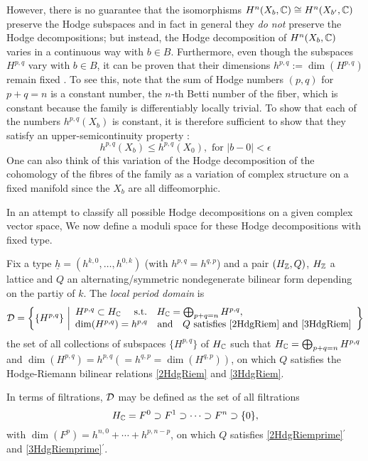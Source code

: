 \documentclass[../main.tex]{subfiles}
\begin{document}
However, there is no guarantee that the isomorphisms $H^n(X_b,\mathbb{C}) \cong H^n(X_{b'},\mathbb{C})$ preserve the Hodge subspaces and in fact in general they \emph{do not} preserve the Hodge decompositions; but instead, the Hodge decomposition of $H^n(X_b,\mathbb{C})$ varies in a continuous way with $b \in B$.
Furthermore, even though the subspaces $H^{p,q}$ vary with $b \in B$, it can be proven that their dimensions $h^{p,q} := \dim(H^{p,q})$ remain fixed \cite[Ch. 9]{Voi07}.
To see this, note that the sum of Hodge numbers $(p,q)$ for $p + q = n$ is a constant number, the $n$-th Betti number of the fiber, which is constant because the family is differentiably locally trivial. To show that each of the numbers $h^{p,q}(X_b)$ is constant, it is therefore sufficient to show that they satisfy an upper-semicontinuity property \cite[Cor. 9.19]{Voi07} :
\[
h^{p,q}(X_b) \leq h^{p,q}(X_0), \text{ for } |b - 0| < \epsilon 
\]
One can also think of this variation of the Hodge decomposition of the cohomology of the fibres of the family as a variation of complex structure on a fixed manifold since the $X_b$ are all diffeomorphic.


In an attempt to classify all possible Hodge decompositions on a given complex vector space, We now define a moduli space for these Hodge decompositions with fixed type.

\begin{defn} \label{Ddefn} Fix a type $\underline{h} = (h^{k,0}, \dots , h^{0,k})$ (with $h^{p,q}=h^{q,p}$) and a pair $(H_{\mathbb{Z}}, Q)$, $H_{\mathbb{Z}}$ a lattice and $Q$ an alternating/symmetric nondegenerate bilinear form depending on the partiy of $k$. 
The \emph{local period domain} is 
 \begin{align*}
 \mathcal{D} =  \left\{ \{H^{p,q}\}  \ \middle\vert \begin{array}{l}
    H^{p,q} \subset H_{\mathbb{C}} \quad \text{ s.t.} \quad H_{\mathbb{C}} = \bigoplus_{p+q=n} H^{p,q},  \\
    \dim (H^{p,q}) = h^{p,q} \quad \textrm{and} \quad Q \text{ satisfies } \eqref{2HdgRiem} \text{ and } \eqref{3HdgRiem}
  \end{array}\right\}
  \end{align*}
the set of all collections of subspaces $\{H^{p,q}\}$ of $H_{\mathbb{C}}$ such that $H_{\mathbb{C}} = \bigoplus_{p+q=n} H^{p,q}$ and $\dim (H^{p,q}) = h^{p,q} \left( =h^{q,p}= \dim (H^{q,p}) \right)$, on which $Q$ satisfies the Hodge-Riemann bilinear relations \eqref{2HdgRiem} and \eqref{3HdgRiem}.
\end{defn}


\begin{rem} In terms of filtrations, $\mathcal{D}$ may be defined as the set of all filtrations 
\[ H_{\mathbb{C}} =F^0 \supset F^1 \supset \cdots \supset F^n \supset \{0\},\]
with $\dim(F^p) = h^{n,0} + \cdots + h^{p,n-p}$, on which $Q$ satisfies \eqref{2HdgRiemprime}$^\prime$ and \eqref{3HdgRiemprime}$^\prime$.
\end{rem}
\end{document}
